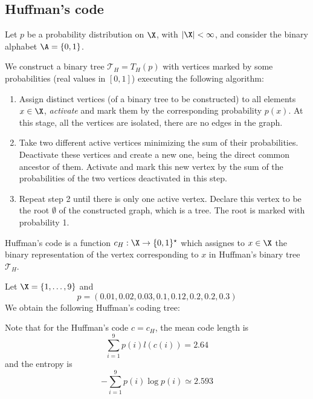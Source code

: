 \documentclass[toc, titlepaged]{../cs-classes/cs-classes}
\begin{document}
\subsection{Huffman's code}
Let $p$ be a probability distribution on $\X$, with $|\X|<\infty$, and consider the binary alphabet $\A=\{0, 1\}$.

\begin{definition}
    We construct a binary tree $\mathcal{T}_H = T_H(p)$ with vertices marked by some probabilities (real values in $[0, 1]$) executing the following algorithm:
    \begin{enumerate}
        \item Assign distinct vertices (of a binary tree to be constructed) to all elements $x\in\X$, \emph{activate} and mark them by the corresponding probability $p(x)$. At this stage, all the vertices are isolated, there are no edges in the graph.
        \item Take two different active vertices minimizing the sum of their probabilities. Deactivate these vertices and create a new one, being the direct common ancestor of them. Activate and mark this new vertex by the sum of the probabilities of the two vertices deactivated in this step.
        \item Repeat step 2 until there is only one active vertex. Declare this vertex to be the root $\emptyset$ of the constructed graph, which is a tree. The root is marked with probability 1.
    \end{enumerate}
\end{definition}

\begin{definition}
    Huffman's code is a function $c_H:\X\to\{0, 1\}^\star$ which assignes to $x\in\X$ the binary representation of the vertex corresponding to $x$ in Huffman's binary tree $\mathcal{T}_H$.
\end{definition}

\begin{example}
    Let $\X=\{1, \dots, 9\}$ and 
    \begin{equation*}
        p=(0.01, 0.02, 0.03, 0.1, 0.12, 0.2, 0.2, 0.3)
    \end{equation*}
    We obtain the following Huffman's coding tree:

    Note that for the Huffman's code $c=c_H$, the mean code length is
    \begin{equation*}
        \sum_{i=1}^9 p(i)l(c(i))=2.64
    \end{equation*}
    and the entropy is
    \begin{equation*}
        -\sum_{i=1}^9 p(i)\log p(i)\simeq 2.593
    \end{equation*}
\end{example}
\end{document}

